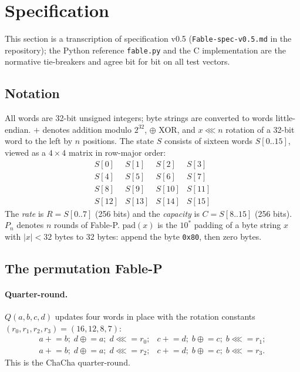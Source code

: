 \documentclass{iacrtrans}
\newcommand{\FableP}{\textsf{Fable-P}\xspace}
\newcommand{\ChaCha}{\textsf{ChaCha}\xspace}
\newcommand{\PP}[1]{P_{#1}}
\newcommand{\rotl}{\lll}
\begin{document}
\section{Specification}
\label{sec:spec}

This section is a transcription of specification v0.5 (\texttt{Fable-spec-v0.5.md} in the repository); the Python reference \texttt{fable.py} and the C implementation are the normative tie-breakers and agree bit for bit on all test vectors.

\subsection{Notation}
All words are 32-bit unsigned integers; byte strings are converted to words little-endian. $+$ denotes addition modulo $2^{32}$, $\oplus$ XOR, and $x \rotl n$ rotation of a 32-bit word to the left by $n$ positions. The state $S$ consists of sixteen words $S[0..15]$, viewed as a $4\times4$ matrix in row-major order:
\[
\begin{array}{cccc}
S[0] & S[1] & S[2] & S[3]\\
S[4] & S[5] & S[6] & S[7]\\
S[8] & S[9] & S[10] & S[11]\\
S[12] & S[13] & S[14] & S[15]
\end{array}
\]
The \emph{rate} is $R = S[0..7]$ (256 bits) and the \emph{capacity} is $C = S[8..15]$ (256 bits). $\PP{n}$ denotes $n$ rounds of \FableP. $\mathrm{pad}(x)$ is the $10^*$ padding of a byte string $x$ with $|x| < 32$ bytes to 32 bytes: append the byte \texttt{0x80}, then zero bytes.

\subsection{The permutation \FableP}
\label{sec:perm}

\paragraph{Quarter-round.} $Q(a,b,c,d)$ updates four words in place with the rotation constants $(r_0,r_1,r_2,r_3) = (16,12,8,7)$:
\[
\begin{array}{ll}
a \mathrel{+}= b;\; d \mathrel{\oplus}= a;\; d \mathrel{\rotl}= r_0; &
c \mathrel{+}= d;\; b \mathrel{\oplus}= c;\; b \mathrel{\rotl}= r_1;\\
a \mathrel{+}= b;\; d \mathrel{\oplus}= a;\; d \mathrel{\rotl}= r_2; &
c \mathrel{+}= d;\; b \mathrel{\oplus}= c;\; b \mathrel{\rotl}= r_3.
\end{array}
\]
This is the \ChaCha quarter-round.
\end{document}
